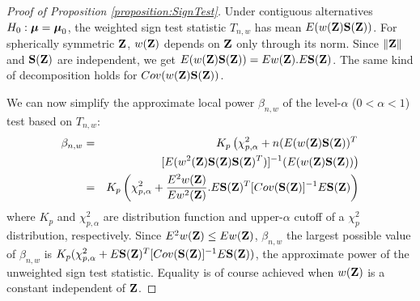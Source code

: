 \documentclass[12pt,letterpaper]{article}
\theoremstyle{definition} \newtheorem{Definition}[Theorem]{Definition}
\begin{document}
\begin{proof}[Proof of Proposition \ref{proposition:SignTest}]
Under contiguous alternatives $H_0: {\boldsymbol{\mu}} = {\boldsymbol{\mu}}_0$, the weighted sign test statistic $T_{n,w}$ has mean $E (w({\mathbf{Z}}) {\mathbf{S}} ({\mathbf{Z}}))$. For spherically symmetric ${\mathbf{Z}}$, $w({\mathbf{Z}})$ depends on ${\mathbf{Z}}$ only through its norm. Since $\| {\mathbf{Z}} \|$ and ${\mathbf{S}}({\mathbf{Z}})$ are independent, we get $E (w({\mathbf{Z}}) {\mathbf{S}} ({\mathbf{Z}})) = E w({\mathbf{Z}}). E {\mathbf{S}} ({\mathbf{Z}})$. The same kind of decomposition holds for $Cov(w({\mathbf{Z}}) {\mathbf{S}}({\mathbf{Z}}))$.

We can now simplify the approximate local power $\beta_{n,w}$ of the level-$\alpha$ ($0 < \alpha < 1$) test based on $T_{n,w}$:
%
\begin{eqnarray*}
\beta_{n,w} &=& K_p \left( \chi^2_{p,\alpha} + n (E (w({\mathbf{Z}}) {\mathbf{S}} ({\mathbf{Z}}))^T \right.\\
&& \left. [ E (w^2({\mathbf{Z}}) {\mathbf{S}} ({\mathbf{Z}}) {\mathbf{S}} ({\mathbf{Z}})^T) ]^{-1} (E (w({\mathbf{Z}}) {\mathbf{S}} ({\mathbf{Z}})) \right)\\
&=& K_p \left( \chi^2_{p,\alpha} + \frac{E^2 w({\mathbf{Z}})}{Ew^2({\mathbf{Z}})}. E{\mathbf{S}}({\mathbf{Z}})^T [Cov({\mathbf{S}}({\mathbf{Z}})]^{-1} E{\mathbf{S}}({\mathbf{Z}}) \right)
\end{eqnarray*}
%
where $K_p$ and $\chi^2_{p,\alpha}$ are distribution function and upper-$\alpha$ cutoff of a $\chi^2_p$ distribution, respectively. Since $E^2 w({\mathbf{Z}}) \leq Ew({\mathbf{Z}})$, $\beta_{n,w}$ the largest possible value of $\beta_{n,w}$ is $K_p ( \chi^2_{p,\alpha} + E{\mathbf{S}}({\mathbf{Z}})^T [Cov({\mathbf{S}}({\mathbf{Z}})]^{-1} E{\mathbf{S}}({\mathbf{Z}}) )$, the approximate power of the unweighted sign test statistic. Equality is of course achieved when $w({\mathbf{Z}})$ is a constant independent of ${\mathbf{Z}}$.
\end{proof}
\end{document}
